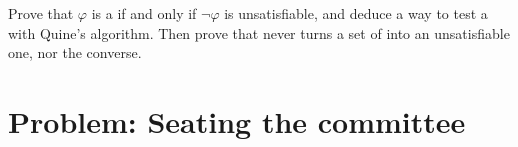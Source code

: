 \begin{exercise}[$\star\star\star$]\label{exo:b1:propositional-logic:12}
Prove that $\varphi$ is a  if and only if $\neg\varphi$ is unsatisfiable, and deduce a way to test a 
with Quine's algorithm. Then prove that  never turns a  set of  into an
unsatisfiable one, nor the converse.
\end{exercise}

\section{Problem: Seating the committee}\label{sec:b1:propositional-logic:problem}

